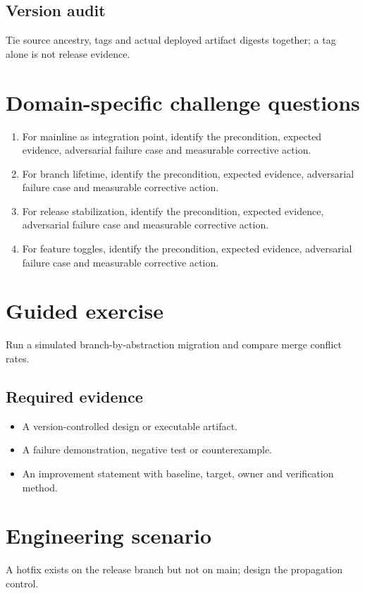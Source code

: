 \documentclass[10pt,letterpaper]{article}
\begin{document}
\subsection{Version audit}
Tie source ancestry, tags and actual deployed artifact digests together; a tag alone is not release evidence.

\section{Domain-specific challenge questions}
\begin{enumerate}
\item For mainline as integration point, identify the precondition, expected evidence, adversarial failure case and measurable corrective action.
\item For branch lifetime, identify the precondition, expected evidence, adversarial failure case and measurable corrective action.
\item For release stabilization, identify the precondition, expected evidence, adversarial failure case and measurable corrective action.
\item For feature toggles, identify the precondition, expected evidence, adversarial failure case and measurable corrective action.
\end{enumerate}
\section{Guided exercise}
Run a simulated branch-by-abstraction migration and compare merge conflict rates.

\subsection{Required evidence}
\begin{itemize}
\item A version-controlled design or executable artifact.
\item A failure demonstration, negative test or counterexample.
\item An improvement statement with baseline, target, owner and verification method.
\end{itemize}


\section{Engineering scenario}
A hotfix exists on the release branch but not on main; design the propagation control.
\end{document}
